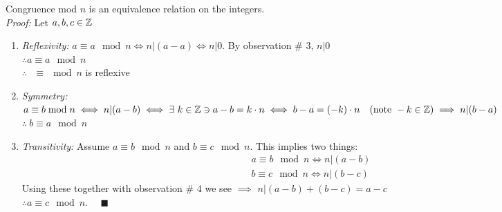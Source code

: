 \begin{lemma}[Part 1] 
Congruence mod $n$ is an equivalence relation on the integers.\steezybreak\\
\textit{Proof:} Let $a,b,c\in {\mathbb{ Z}}$
\begin{enumerate}
    \item \textit{Reflexivity:} $a\equiv a\mod n \iff n|(a-a) \iff n|0$. By observation \# 3, $n|0$\\
    $\therefore a\equiv a\mod n$\\
    $\therefore \ \ \ \equiv \mod n$ is reflexive\\
    \item \textit{Symmetry:} \\
    $a\equiv b\bmod n \iff n|(a-b) \iff \exists \ k \in {\mathbb{ Z}} \ni a-b=k\cdot n \iff b-a=(-k)\cdot n \ \ \ (\text{note } -k\in {\mathbb{ Z}}) \implies n|(b-a)$\\
    $\therefore \ b\equiv a \mod n$
    \item \textit{Transitivity:} Assume $a\equiv b \mod n$ and $b\equiv c\mod n$. This implies two things:
    \begin{align}
        a\equiv b\mod n \iff n|(a-b) \nonumber\\
        b\equiv c\mod n \iff n|(b-c) \nonumber
    \end{align}
    Using these together with observation \# 4 we see $\implies$ $n|(a-b)+(b-c)=a-c$\\
    $\therefore a\equiv c \mod n.\ \ \ \ \ \ \blacksquare$
\end{enumerate}
\end{lemma}
